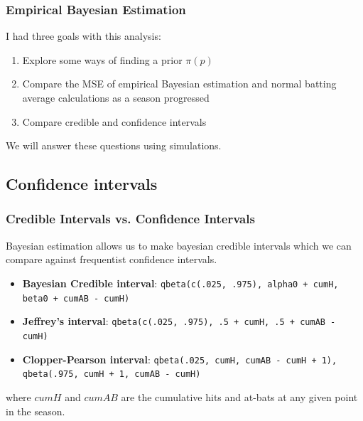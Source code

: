 \documentclass{beamer}
\begin{document}
\begin{frame}
	\frametitle{Empirical Bayesian Estimation}
	I had three goals with this analysis:
	\begin{enumerate}
		\item Explore some ways of finding a prior $\pi(p)$
		\item Compare the MSE of empirical Bayesian estimation and normal batting average calculations as a season progressed
		\item Compare credible and confidence intervals
	\end{enumerate}
	We will answer these questions using simulations.
\end{frame}

\subsection{Confidence intervals}
\begin{frame}
\frametitle{Credible Intervals vs. Confidence Intervals}
Bayesian estimation allows us to make bayesian credible intervals which we can compare against frequentist confidence intervals. 
\begin{itemize}
	\item \textbf{Bayesian Credible interval}: \texttt{qbeta(c(.025, .975), alpha0 + cumH, beta0 + cumAB - cumH)}
	\item \textbf{Jeffrey's interval}: \texttt{qbeta(c(.025, .975), .5 + cumH, .5 + cumAB - cumH)}
	\item \textbf{Clopper-Pearson interval}: \texttt{qbeta(.025, cumH, cumAB - cumH + 1), qbeta(.975, cumH + 1, cumAB - cumH)}
\end{itemize}
where $cumH$ and $cumAB$ are the cumulative hits and at-bats at any given point in the season.\cite{robinson}
\end{frame}
\end{document}

